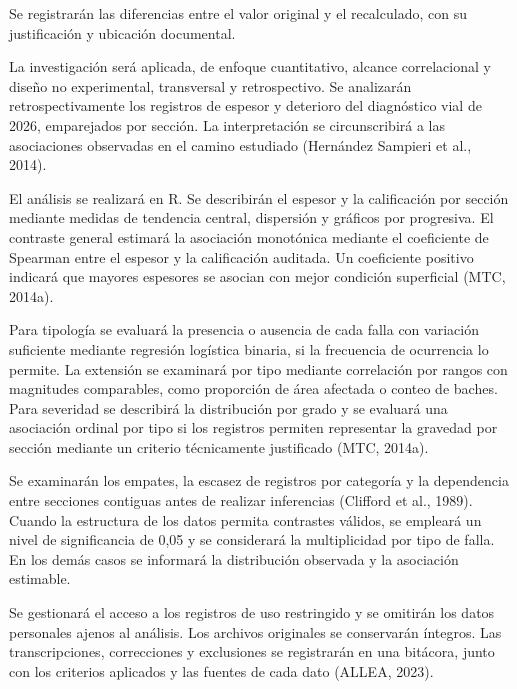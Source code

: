 \documentclass[12pt,a4paper]{article}
\begin{document}
Se registrarán las diferencias entre el valor original y el recalculado, con su justificación y ubicación documental.

La investigación será aplicada, de enfoque cuantitativo, alcance correlacional y diseño no experimental, transversal y retrospectivo. Se analizarán retrospectivamente los registros de espesor y deterioro del diagnóstico vial de 2026, emparejados por sección. La interpretación se circunscribirá a las asociaciones observadas en el camino estudiado (Hernández Sampieri et al., 2014).

El análisis se realizará en R. Se describirán el espesor y la calificación por sección mediante medidas de tendencia central, dispersión y gráficos por progresiva. El contraste general estimará la asociación monotónica mediante el coeficiente de Spearman entre el espesor y la calificación auditada. Un coeficiente positivo indicará que mayores espesores se asocian con mejor condición superficial (MTC, 2014a).

Para tipología se evaluará la presencia o ausencia de cada falla con variación suficiente mediante regresión logística binaria, si la frecuencia de ocurrencia lo permite. La extensión se examinará por tipo mediante correlación por rangos con magnitudes comparables, como proporción de área afectada o conteo de baches. Para severidad se describirá la distribución por grado y se evaluará una asociación ordinal por tipo si los registros permiten representar la gravedad por sección mediante un criterio técnicamente justificado (MTC, 2014a).

Se examinarán los empates, la escasez de registros por categoría y la dependencia entre secciones contiguas antes de realizar inferencias (Clifford et al., 1989). Cuando la estructura de los datos permita contrastes válidos, se empleará un nivel de significancia de 0,05 y se considerará la multiplicidad por tipo de falla. En los demás casos se informará la distribución observada y la asociación estimable.

Se gestionará el acceso a los registros de uso restringido y se omitirán los datos personales ajenos al análisis. Los archivos originales se conservarán íntegros. Las transcripciones, correcciones y exclusiones se registrarán en una bitácora, junto con los criterios aplicados y las fuentes de cada dato (ALLEA, 2023).
\end{document}
